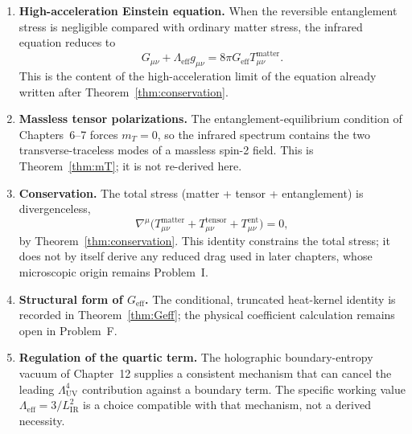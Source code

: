 \begin{enumerate}
  \item \textbf{High-acceleration Einstein equation.}
        When the reversible entanglement stress is negligible
        compared with ordinary matter stress, the infrared equation
        reduces to
        \begin{equation}
          G_{\mu\nu}+\Lambda_{\mathrm{eff}}g_{\mu\nu}
          =8\pi G_{\mathrm{eff}}T_{\mu\nu}^{\mathrm{matter}}.
        \end{equation}
        This is the content of the high-acceleration limit of
        the equation already written after Theorem~\ref{thm:conservation}.

  \item \textbf{Massless tensor polarizations.}
        The entanglement-equilibrium condition of Chapters~6--7
        forces \(m_T=0\), so the infrared spectrum contains the
        two transverse-traceless modes of a massless spin-2 field.
        This is Theorem~\ref{thm:mT}; it is not re-derived here.

  \item \textbf{Conservation.}
        The total stress (matter + tensor + entanglement) is
        divergenceless,
        \begin{equation}
          \nabla^\mu\bigl(T_{\mu\nu}^{\mathrm{matter}}
          +T_{\mu\nu}^{\mathrm{tensor}}
          +T_{\mu\nu}^{\mathrm{ent}}\bigr)=0,
        \end{equation}
        by Theorem~\ref{thm:conservation}. This identity constrains the
        total stress; it does not by itself derive any reduced drag used in
        later chapters, whose microscopic origin remains Problem~I.

  \item \textbf{Structural form of \(G_{\mathrm{eff}}\).}
        The conditional, truncated heat-kernel identity is recorded
        in Theorem~\ref{thm:Geff}; the physical coefficient
        calculation remains open in Problem~F.

  \item \textbf{Regulation of the quartic term.}
        The holographic boundary-entropy vacuum of Chapter~12
        supplies a consistent mechanism that can cancel the
        leading \(\Lambda_{\mathrm{UV}}^4\) contribution against
        a boundary term. The specific working value
        \(\Lambda_{\mathrm{eff}}=3/L_{\mathrm{IR}}^2\) is a choice
        compatible with that mechanism, not a derived necessity.
\end{enumerate}

